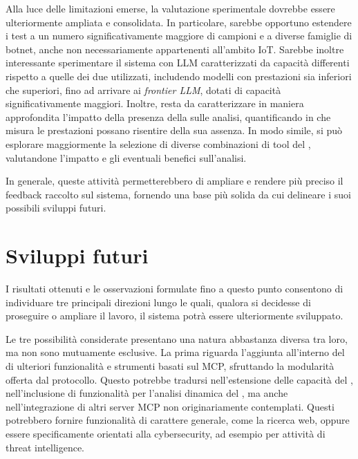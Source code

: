 Alla luce delle limitazioni emerse, la valutazione sperimentale dovrebbe essere ulteriormente ampliata e consolidata. In particolare, sarebbe opportuno estendere i test a un numero significativamente maggiore di campioni e a diverse famiglie di botnet, anche non necessariamente appartenenti all'ambito IoT. Sarebbe inoltre interessante sperimentare il sistema con LLM caratterizzati da capacità differenti rispetto a quelle dei due utilizzati, includendo modelli con prestazioni sia inferiori che superiori, fino ad arrivare ai \emph{frontier LLM}, dotati di capacità significativamente maggiori. Inoltre, resta da caratterizzare in maniera approfondita l'impatto della presenza della \kb{} sulle analisi, quantificando in che misura le prestazioni possano risentire della sua assenza. In modo simile, si può esplorare maggiormente la selezione di diverse combinazioni di tool del \sreframework{}, valutandone l'impatto e gli eventuali benefici sull'analisi.


In generale, queste attività permetterebbero di ampliare e rendere più preciso il feedback raccolto sul sistema, fornendo una base più solida da cui delineare i suoi possibili sviluppi futuri.

\section{Sviluppi futuri}

I risultati ottenuti e le osservazioni formulate fino a questo punto consentono di individuare tre principali direzioni lungo le quali, qualora si decidesse di proseguire o ampliare il lavoro, il sistema \system{} potrà essere ulteriormente sviluppato.

Le tre possibilità considerate presentano una natura abbastanza diversa tra loro, ma non sono mutuamente esclusive. La prima riguarda l'aggiunta all'interno del \sreagent{} di ulteriori funzionalità e strumenti basati sul MCP, sfruttando la modularità offerta dal protocollo. Questo potrebbe tradursi nell'estensione delle capacità del \sandbox{}, nell'inclusione di funzionalità per l'analisi dinamica del \sreframework{}, ma anche nell'integrazione di altri server MCP non originariamente contemplati. Questi potrebbero fornire funzionalità di carattere generale, come la ricerca web, oppure essere specificamente orientati alla cybersecurity, ad esempio per attività di threat intelligence.


